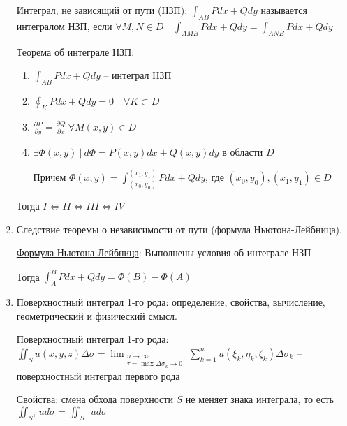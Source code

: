 \documentclass[12pt]{article}
\begin{document}
\begin{enumerate}
        \hyperlink{pathindependentintegrals}{Интеграл, не зависящий от пути (НЗП)}: $\int_{AB}Pdx + Qdy$ называется интегралом НЗП, если $\forall M, N \in D \quad \int_{AMB}Pdx + Qdy = \int_{ANB}Pdx + Qdy$

        \hyperlink{theorempathindependentintegrals}{Теорема об интеграле НЗП}:

        \begin{enumerate}[label=\Roman*.]

        \item $\int_{AB} Pdx + Qdy$ -- интеграл НЗП

        \item $\oint_K Pdx + Qdy = 0 \quad \forall K \subset D$

        \item $\frac{\partial P}{\partial y} = \frac{\partial Q}{\partial x} \ \forall M(x, y) \in D$

        \item $\exists \Phi(x, y) \ | \ d\Phi = P(x, y)dx + Q(x, y)dy$ в области $D$

        Причем $\Phi(x, y) = \int_{(x_0,y_0)}^{(x_1,y_1)}Pdx+Qdy$, где $(x_0, y_0), (x_1,y_1) \in D$

        \end{enumerate}

        Тогда $I \Longleftrightarrow II \Longleftrightarrow III \Longleftrightarrow IV$

        \item Следствие теоремы о независимости от пути (формула Ньютона-Лейбница).

        \hyperlink{theoremNewtonLeibnizforpathindependantintegral}{Формула Ньютона-Лейбница}:
        Выполнены условия \Ths об интеграле НЗП

        Тогда $\int_A^B Pdx + Qdy = \Phi(B) - \Phi(A)$

        \item Поверхностный интеграл 1-го рода: определение, свойства, вычисление, геометрический и физический смысл.

        \hyperlink{surfaceintegraloffirstkind}{Поверхностный интеграл 1-го рода}:
        $\iint_S u(x, y, z) \Delta \sigma = \lim_{\substack{n \to \infty \\ \tau = \max \Delta \sigma_k \to 0}} \sum_{k = 1}^{n} u(\xi_k, \eta_k, \zeta_k) \Delta \sigma_k$ -- поверхностный интеграл первого рода

        \hyperlink{surfaceintegraloffirstkindproperties}{Свойства}: смена обхода поверхности $S$ не меняет знака интеграла, то есть $\iint_{S^+} u d\sigma = \iint_{S^-} u d\sigma$


\end{enumerate}
\end{document}
